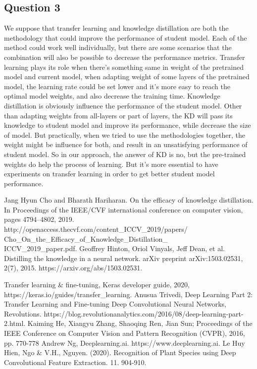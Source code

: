\documentclass[conference]{IEEEtran}
\begin{document}
\subsection{Question 3} %


We suppose that transfer learning and knowledge distillation are both the methodology that could improve the performance of student model. Each of the method could work well individually, but there are some scenarios that the combination will also be possible to decrease the performance metrics. Transfer learning plays its role when there's something same in weight of the pretrained model and current model, when adapting weight of some layers of the pretrained model, the learning rate could be set lower and it's more easy to reach the optimal model weights, and also decrease the training time. Knowledge distillation is obviously influence the performance of the student model. Other than adapting weights from all-layers or part of layers, the KD will pass its knowledge to student model and improve its performance, while decrease the size of model. But practically, when we tried to use the methodologies together, the weight might be influence for both, and result in an unsatisfying performance of student model. So in our approach, the answer of KD is no, but the pre-trained weights do help the process of learning. But it's more essential to have experiments on transfer learning in order to get better student model performance.

\begin{thebibliography}{00}


 Jang Hyun Cho and Bharath Hariharan. On the efficacy of knowledge distillation. In Proceedings of the IEEE/CVF international conference on computer vision, pages 4794–4802, 2019. http://openaccess.thecvf.com/content\_ICCV\_2019/papers/\\Cho\_On\_the\_Efficacy\_of\_Knowledge\_Distillation\_\\ICCV\_2019\_paper.pdf.
 Geoffrey Hinton, Oriol Vinyals, Jeff Dean, et al. Distilling the knowledge in a neural network. arXiv preprint arXiv:1503.02531, 2(7), 2015. https://arxiv.org/abs/1503.02531.

 Transfer learning \& fine-tuning, Keras developer guide, 2020, https://keras.io/guides/transfer\_learning.
 Anusua Trivedi, Deep Learning Part 2: Transfer Learning and Fine-tuning Deep Convolutional Neural Networks, Revolutions. https://blog.revolutionanalytics.com/2016/08/deep-learning-part-2.html.
 Kaiming He, Xiangyu Zhang, Shaoqing Ren, Jian Sun; Proceedings of the IEEE Conference on Computer Vision and Pattern Recognition (CVPR), 2016, pp. 770-778
 Andrew Ng, Deeplearning.ai. https://www.deeplearning.ai.
Le Huy Hien, Ngo \& V.H., Nguyen. (2020). Recognition of Plant Species using Deep Convolutional Feature Extraction. 11. 904-910.
\end{thebibliography}
\end{document}
